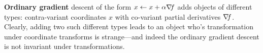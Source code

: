 
\textbf{Ordinary gradient} descent of the form $x \gets x + \alpha {\nabla_{\!\!}} f$
adds objects of different types: contra-variant coordinates $x$ with co-variant partial derivatives ${\nabla_{\!\!}} f$. Clearly, adding two such different
types leads to an object who's transformation under coordinate
transforms is strange---and indeed the ordinary gradient descent is
not invariant under transformations.








